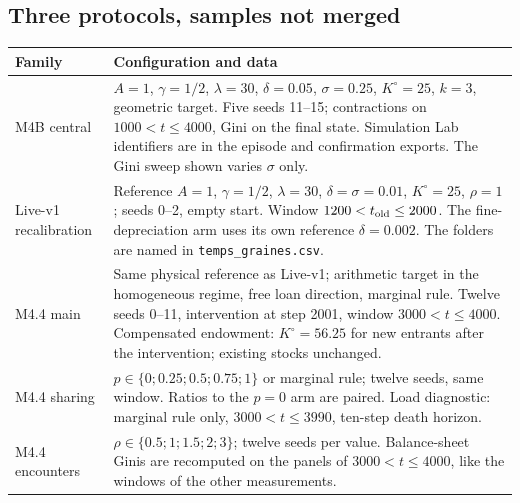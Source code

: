 \subsection{Three protocols, samples not merged}
\begin{small}
\begin{longtable}{@{}p{.18\linewidth}p{.75\linewidth}@{}}
\toprule Family & Configuration and data \\\midrule\endhead
M4B central & $A=1$, $\gamma=1/2$, $\lambda=30$, $\delta=0.05$,
$\sigma=0.25$, $K^\circ=25$, $k=3$, geometric target. Five seeds
11--15; contractions on $1000<t\le4000$, Gini on the final state.
Simulation Lab identifiers are in the episode and confirmation
exports. The Gini sweep shown varies $\sigma$ only. \\
Live-v1 recalibration & Reference $A=1$, $\gamma=1/2$, $\lambda=30$,
$\delta=\sigma=0.01$, $K^\circ=25$, $\rho=1$; seeds 0--2,
empty start. Window $1200<t_{\rm old}\le2000$.
The fine-depreciation arm uses its own reference $\delta=0.002$.
The folders are named in \texttt{temps\_graines.csv}. \\
M4.4 main & Same physical reference as Live-v1; arithmetic target
in the homogeneous regime, free loan direction, marginal rule. Twelve seeds
0--11, intervention at step 2001, window $3000<t\le4000$.
Compensated endowment: $K^\circ=56.25$ for new entrants
after the intervention; existing stocks unchanged. \\
M4.4 sharing & $p\in\{0;0.25;0.5;0.75;1\}$ or marginal rule;
twelve seeds, same window. Ratios to the $p=0$ arm are paired.
Load diagnostic: marginal rule only, $3000<t\le3990$,
ten-step death horizon. \\
M4.4 encounters & $\rho\in\{0.5;1;1.5;2;3\}$; twelve seeds
per value. Balance-sheet Ginis are recomputed on the panels of
$3000<t\le4000$, like the windows of the other measurements. \\
\bottomrule
\end{longtable}
\end{small}

